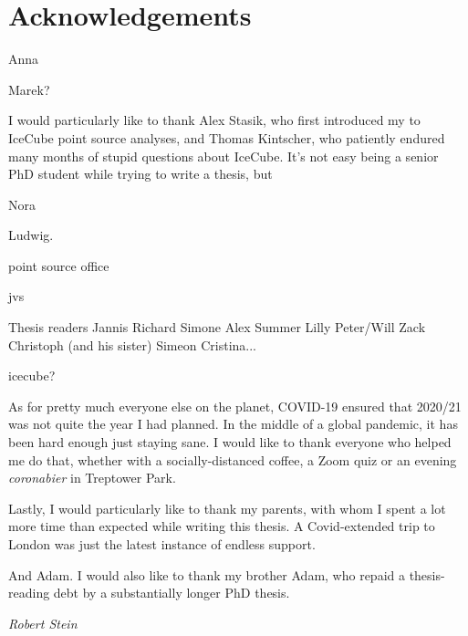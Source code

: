 \chapter*{Acknowledgements}

Anna

Marek?

I would particularly like to thank Alex Stasik, who first introduced my to IceCube point source analyses, and Thomas Kintscher, who patiently endured many months of stupid questions about IceCube. It's not easy being a senior PhD student while trying to write a thesis, but  

Nora 

Ludwig.

point source office 

jvs

Thesis readers Jannis Richard Simone Alex Summer Lilly Peter/Will Zack Christoph (and his sister) Simeon Cristina...

icecube?

As for pretty much everyone else on the planet, COVID-19 ensured that 2020/21 was not quite the year I had planned. In the middle of a global pandemic, it has been hard enough just staying sane. I would like to thank everyone who helped me do that, whether with a socially-distanced coffee, a Zoom quiz or an evening \emph{coronabier} in Treptower Park.

Lastly, I would particularly like to thank my parents, with whom I spent a lot more time than expected while writing this thesis. A Covid-extended trip to London was just the latest instance of endless support.

And Adam. I would also like to thank my brother Adam, who repaid a thesis-reading debt by  a substantially longer PhD thesis. 

\begin{flushright}
	\textit{Robert Stein}
\end{flushright}

